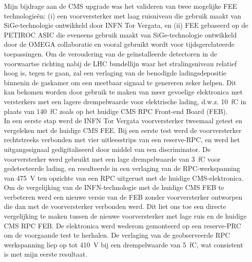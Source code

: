 	Mijn bijdrage aan de CMS upgrade was het valideren van twee mogelijke FEE technologieën: (i) een voorversterker met laag ruisniveau die gebruik maakt van SiGe-technologie ontwikkeld door INFN Tor Vergata, en (ii) FEE gebaseerd op de PETIROC ASIC die eveneens gebruik maakt van SiGe-technologie ontwikkeld door de OMEGA collaboratie en vooral gebruikt wordt voor tijdsgerelateerde toepassingen. Om de veroudering van de geïnstalleerde detectoren in de voorwaartse richting nabij de LHC bundellijn waar het stralingsniveau relatief hoog is, tegen te gaan, zal een verlaging van de benodigde ladingsdepositie binnenin de gaskamer om een meetbaar signaal te genereren zeker helpen. Dit kan bekomen worden door gebruik te maken van meer gevoelige elektronica met versterkers met een lagere drempelwaarde voor elektrische lading, d.w.z. \SI{10}{fC} in plaats van \SI{140}{fC} zoals op het huidige CMS RPC Front-end Board (FEB).\\
	In een eerste stap werd de INFN Tor Vergata voorversterker tweemaal getest en vergeleken met de huidige CMS FEE. Bij een eerste test werd de voorversterker rechtstreeks verbonden met vier uitleesstrips van een reserve-RPC, en werd het uitgangssignaal gedigitaliseerd door middel van een discriminator. De voorversterker werd gebruikt met een lage drempelwaarde van \SI{3}{fC} voor gedetecteerde lading, en resulteerde in een verlaging van de RPC-werkspanning van \SI{475}{V} ten opzichte van een RPC uitgerust met de huidige CMS-elektronica. Om de vergelijking van de INFN-technologie met de huidige CMS FEB te verbeteren werd een nieuwe versie van de FEB zonder voorversterker ontworpen die dan met de voorversterker verbonden werd. Dit liet ons toe een directe vergelijking te maken tussen de nieuwe voorversterker met lage ruis en de huidige CMS RPC FEB. De elektronica werd wederom gemonteerd op een reserve-PRC om de voorgaande test te herhalen. De verlaging van de geobserveerde RPC werkspanning liep op tot \SI{410}{V} bij een drempelwaarde van \SI{5}{fC}, wat consistent is met mijn eerste resultaat.\\

